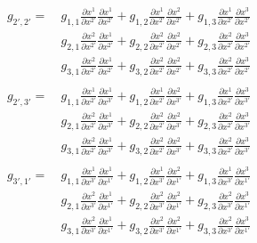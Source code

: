 \documentclass[9pt]{report}
\begin{document}
  \]
  \[
    \begin{align*}
    g_{2', 2'} =
     &\ g_{1,1}\frac{\partial x^1}{\partial x^{2'}}\frac{\partial x^1}{\partial x^{2'}}
    +g_{1,2}\frac{\partial x^1}{\partial x^{2'}}\frac{\partial x^2}{\partial x^{2'}}
    +g_{1,3}\frac{\partial x^1}{\partial x^{2'}}\frac{\partial x^3}{\partial x^{2'}}\\
    &\
     g_{2,1}\frac{\partial x^2}{\partial x^{2'}}\frac{\partial x^1}{\partial x^{2'}}
    +g_{2,2}\frac{\partial x^2}{\partial x^{2'}}\frac{\partial x^2}{\partial x^{2'}}
    +g_{2,3}\frac{\partial x^2}{\partial x^{2'}}\frac{\partial x^3}{\partial x^{2'}}\\
    &\
     g_{3,1}\frac{\partial x^2}{\partial x^{2'}}\frac{\partial x^1}{\partial x^{2'}}
    +g_{3,2}\frac{\partial x^2}{\partial x^{2'}}\frac{\partial x^2}{\partial x^{2'}}
    +g_{3,3}\frac{\partial x^2}{\partial x^{2'}}\frac{\partial x^3}{\partial x^{2'}}\\
    \end{align*}
  \]
  \[
    \begin{align*}
    g_{2', 3'} =
     &\ g_{1,1}\frac{\partial x^1}{\partial x^{2'}}\frac{\partial x^1}{\partial x^{3'}}
    +g_{1,2}\frac{\partial x^1}{\partial x^{2'}}\frac{\partial x^2}{\partial x^{3'}}
    +g_{1,3}\frac{\partial x^1}{\partial x^{2'}}\frac{\partial x^3}{\partial x^{3'}}\\
    &\
     g_{2,1}\frac{\partial x^2}{\partial x^{2'}}\frac{\partial x^1}{\partial x^{3'}}
    +g_{2,2}\frac{\partial x^2}{\partial x^{2'}}\frac{\partial x^2}{\partial x^{3'}}
    +g_{2,3}\frac{\partial x^2}{\partial x^{2'}}\frac{\partial x^3}{\partial x^{3'}}\\
    &\
     g_{3,1}\frac{\partial x^2}{\partial x^{2'}}\frac{\partial x^1}{\partial x^{3'}}
    +g_{3,2}\frac{\partial x^2}{\partial x^{2'}}\frac{\partial x^2}{\partial x^{3'}}
    +g_{3,3}\frac{\partial x^2}{\partial x^{2'}}\frac{\partial x^3}{\partial x^{3'}}\\
    \end{align*}
  \]
  \[
    \begin{align*}
    g_{3', 1'} =\
     &g_{1,1}\frac{\partial x^1}{\partial x^{3'}}\frac{\partial x^1}{\partial x^{1'}}
    +g_{1,2}\frac{\partial x^1}{\partial x^{3'}}\frac{\partial x^2}{\partial x^{1'}}
    +g_{1,3}\frac{\partial x^1}{\partial x^{3'}}\frac{\partial x^3}{\partial x^{1'}}\\
    &
     g_{2,1}\frac{\partial x^2}{\partial x^{3'}}\frac{\partial x^1}{\partial x^{1'}}
    +g_{2,2}\frac{\partial x^2}{\partial x^{3'}}\frac{\partial x^2}{\partial x^{1'}}
    +g_{2,3}\frac{\partial x^2}{\partial x^{3'}}\frac{\partial x^3}{\partial x^{1'}}\\
    &
     g_{3,1}\frac{\partial x^2}{\partial x^{3'}}\frac{\partial x^1}{\partial x^{1'}}
    +g_{3,2}\frac{\partial x^2}{\partial x^{3'}}\frac{\partial x^2}{\partial x^{1'}}
    +g_{3,3}\frac{\partial x^2}{\partial x^{3'}}\frac{\partial x^3}{\partial x^{1'}}\\
    \end{align*}
  \]
\end{document}
